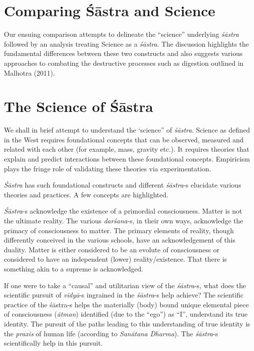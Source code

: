 \section*{Comparing Śāstra and Science}

Our ensuing comparison attempts to delineate the “science” underlying \textit{śāstra} followed by an analysis treating Science as a \textit{śāstra}. The discussion highlights the fundamental differences between these two constructs and also suggests various approaches to combating the destructive processes such as digestion outlined in Malhotra (2011).


\section*{The Science of Śāstra}

We shall in brief attempt to understand the ‘science” of \textit{śāstra}. Science as defined in the West requires foundational concepts that can be observed, measured and related with each other (for example, mass, gravity etc.). It requires theories that explain and predict interactions between these foundational concepts. Empiricism plays the fringe role of validating these theories via experimentation.

\textit{Śāstra} has such foundational constructs and different \textit{śāstra}-s elucidate various theories and practices. A few concepts are highlighted.

\textit{Śāstra}-s acknowledge the existence of a primordial consciousness. Matter is not the ultimate reality. The various \textit{darśana}-s, in their own ways, acknowledge the primacy of consciousness to matter. The primary elements of reality, though differently conceived in the various schools, have an acknowledgement of this duality. Matter is either considered to be an evolute of consciousness or considered to have an independent (lower) reality/existence. That there is something akin to a supreme is acknowledged.

If one were to take a “causal” and utilitarian view of the \textit{śāstra}-s, what does the scientific pursuit of \textit{vidyā}-s ingrained in the \textit{śāstra}-s help achieve? The scientific practice of the śāstra-s helps the materially (body) bound unique elemental piece of consciousness (\textit{ātman}) identified (due to the “ego”) as “I”, understand its true identity. The pursuit of the paths leading to this understanding of true identity is the \textit{praxis} of human life (according to \textit{Sanātana Dharma}). The \textit{śāstra}-s scientifically help in this pursuit. 

